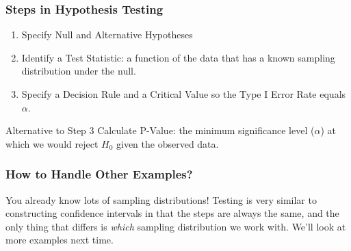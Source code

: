 \documentclass[handout]{beamer}
\begin{document}
\begin{frame}
\frametitle{Steps in Hypothesis Testing}

\begin{enumerate}
\item Specify Null and Alternative Hypotheses
\item Identify a Test Statistic: a function of the data that has a known sampling distribution under the null.
\item Specify a Decision Rule and a Critical Value so the Type I Error Rate equals $\alpha$.
\end{enumerate}

\begin{alertblock}{Alternative to Step 3}
	Calculate P-Value: the minimum significance level  ($\alpha$) at which we would reject $H_0$ given the observed data.
\end{alertblock}

\end{frame}


\begin{frame}
\frametitle{How to Handle Other Examples?}

\alert{You already know lots of sampling distributions! Testing is very similar to constructing confidence intervals in that the steps are always the same, and the only thing that differs is \emph{which} sampling distribution we work with. We'll look at more examples next time.}

\end{frame}
\end{document}
